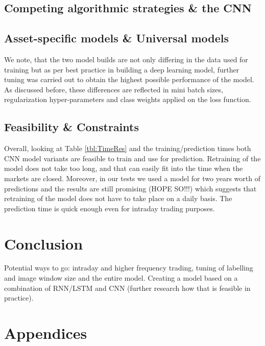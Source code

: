 \documentclass[11pt, a4paper]{article}
\begin{document}
\subsection{Competing algorithmic strategies \& the CNN}


\subsection{Asset-specific models \& Universal models}

We note, that the two model builds are not only differing in the data used for training but as per best practice in building a deep learning model, further tuning was carried out to obtain the highest possible performance of the model. As discussed before, these differences are reflected in mini batch sizes, regularization hyper-parameters and class weights applied on the loss function.

\subsection{Feasibility \& Constraints}
Overall, looking at Table \ref{tbl:TimeRes} and the training/prediction times both CNN model variants are feasible to train and use for prediction. Retraining of the model does not take too long, and that can easily fit into the time when the markets are closed. Moreover, in our tests we used a model for two years worth of predictions and the results are still promising (HOPE SO!!!) which suggests that retraining of the model does not have to take place on a daily basis. The prediction time is quick enough even for intraday trading purposes. 

\section{Conclusion}
\label{sec:Conclusion}

Potential ways to go: intraday and higher frequency trading, tuning of labelling and image window size and the entire model. Creating a model based on a combination of RNN/LSTM and CNN (further research how that is feasible in practice).

\section{Appendices}
\label{sec:App}
\end{document}
